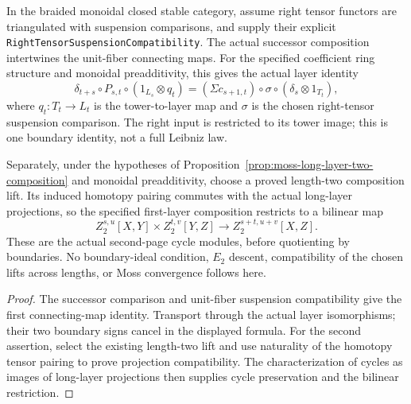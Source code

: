 \begin{proposition}
  \label{prop:moss-boundary-and-two-cycles}
  \leanok
  In the braided monoidal closed stable category, assume right tensor
  functors are triangulated with suspension comparisons, and supply their
  explicit \texttt{RightTensorSuspensionCompatibility}.  The actual
  successor composition intertwines the unit-fiber connecting maps.
  For the specified coefficient ring structure and monoidal preadditivity,
  this gives the actual layer identity
  \[
    \delta_{t+s}\circ P_{s,t}\circ(1_{L_s}\otimes q_t)
      =(\Sigma c_{s+1,t})\circ\sigma\circ(\delta_s\otimes1_{T_t}),
  \]
  where $q_t:T_t\to L_t$ is the tower-to-layer map and $\sigma$ is the
  chosen right-tensor suspension comparison.  The right input is restricted
  to its tower image; this is one boundary identity, not a full Leibniz law.

  Separately, under the hypotheses of
  Proposition~\ref{prop:moss-long-layer-two-composition} and monoidal
  preadditivity, choose a proved length-two composition lift.  Its induced
  homotopy pairing commutes with the actual long-layer projections, so the
  specified first-layer composition restricts to a bilinear map
  \[
    Z_2^{s,u}[X,Y]\times Z_2^{t,v}[Y,Z]
      \longrightarrow Z_2^{s+t,u+v}[X,Z].
  \]
  These are the actual second-page cycle modules, before quotienting by
  boundaries.  No boundary-ideal condition, $E_2$ descent, compatibility of
  the chosen lifts across lengths, or Moss convergence follows here.
\end{proposition}
\begin{proof}
  \leanok
  The successor comparison and unit-fiber suspension compatibility give
  the first connecting-map identity.  Transport through the actual layer
  isomorphisms; their two boundary signs cancel in the displayed formula.
  For the second assertion, select the existing length-two lift and use
  naturality of the homotopy tensor pairing to prove projection
  compatibility.  The characterization of cycles as images of long-layer
  projections then supplies cycle preservation and the bilinear restriction.
\end{proof}

